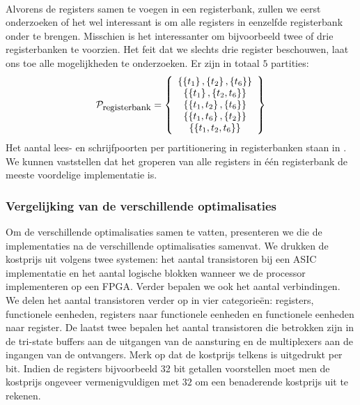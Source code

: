 \paragraph{}
Alvorens de registers samen te voegen in een registerbank, zullen we eerst onderzoeken of het wel interessant is om alle registers in eenzelfde registerbank onder te brengen. Misschien is het interessanter om bijvoorbeeld twee of drie registerbanken te voorzien. Het feit dat we slechts drie register beschouwen, laat ons toe alle mogelijkheden te onderzoeken. Er zijn in totaal $5$ partities:
\begin{equation}
\mathcal{P}_{\mbox{\small registerbank}}=\left\{ \begin{array}{c} 
\left\{ \left\{ t_1 \right\},\left\{ t_2 \right\},\left\{ t_6 \right\} \right\}\\
\left\{ \left\{ t_1 \right\},\left\{ t_2,t_6 \right\} \right\}\\
\left\{ \left\{ t_1,t_2 \right\},\left\{ t_6 \right\} \right\}\\
\left\{ \left\{ t_1,t_6 \right\},\left\{ t_2 \right\} \right\}\\
\left\{ \left\{ t_1,t_2,t_6 \right\} \right\}
 \end{array} \right\}
\end{equation}
Het aantal lees- en schrijfpoorten per partitionering in registerbanken staan in . We kunnen vaststellen dat het groperen van alle registers in \'e\'en registerbank de meeste voordelige implementatie is.
\subsubsection{Vergelijking van de verschillende optimalisaties}
Om de verschillende optimalisaties samen te vatten, presenteren we  die de implementaties na de verschillende optimalisaties samenvat. We drukken de kostprijs uit volgens twee systemen: het aantal transistoren bij een ASIC implementatie en het aantal logische blokken wanneer we de processor implementeren op een FPGA. Verder bepalen we ook het aantal verbindingen. We delen het aantal transistoren verder op in vier categorie\"en: registers, functionele eenheden, registers naar functionele eenheden en functionele eenheden naar register. De laatst twee bepalen het aantal transistoren die betrokken zijn in de tri-state buffers aan de uitgangen van de aansturing en de multiplexers aan de ingangen van de ontvangers. Merk op dat de kostprijs telkens is uitgedrukt per bit. Indien de registers bijvoorbeeld 32 bit getallen voorstellen moet men de kostprijs ongeveer vermenigvuldigen met $32$ om een benaderende kostprijs uit te rekenen.

